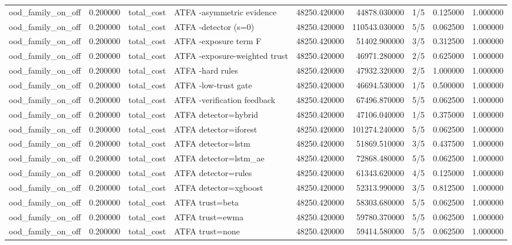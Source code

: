 \begin{tabular}{lrllrrlrr}
ood\_family\_on\_off & 0.200000 & total\_cost & ATFA -asymmetric evidence & 48250.420000 & 44878.030000 & 1/5 & 0.125000 & 1.000000 \\
ood\_family\_on\_off & 0.200000 & total\_cost & ATFA -detector (s=0) & 48250.420000 & 110543.030000 & 5/5 & 0.062500 & 1.000000 \\
ood\_family\_on\_off & 0.200000 & total\_cost & ATFA -exposure term F & 48250.420000 & 51402.900000 & 3/5 & 0.312500 & 1.000000 \\
ood\_family\_on\_off & 0.200000 & total\_cost & ATFA -exposure-weighted trust & 48250.420000 & 46971.280000 & 2/5 & 0.625000 & 1.000000 \\
ood\_family\_on\_off & 0.200000 & total\_cost & ATFA -hard rules & 48250.420000 & 47932.320000 & 2/5 & 1.000000 & 1.000000 \\
ood\_family\_on\_off & 0.200000 & total\_cost & ATFA -low-trust gate & 48250.420000 & 46694.530000 & 1/5 & 0.500000 & 1.000000 \\
ood\_family\_on\_off & 0.200000 & total\_cost & ATFA -verification feedback & 48250.420000 & 67496.870000 & 5/5 & 0.062500 & 1.000000 \\
ood\_family\_on\_off & 0.200000 & total\_cost & ATFA detector=hybrid & 48250.420000 & 47106.040000 & 1/5 & 0.375000 & 1.000000 \\
ood\_family\_on\_off & 0.200000 & total\_cost & ATFA detector=iforest & 48250.420000 & 101274.240000 & 5/5 & 0.062500 & 1.000000 \\
ood\_family\_on\_off & 0.200000 & total\_cost & ATFA detector=lstm & 48250.420000 & 51869.510000 & 3/5 & 0.437500 & 1.000000 \\
ood\_family\_on\_off & 0.200000 & total\_cost & ATFA detector=lstm\_ae & 48250.420000 & 72868.480000 & 5/5 & 0.062500 & 1.000000 \\
ood\_family\_on\_off & 0.200000 & total\_cost & ATFA detector=rules & 48250.420000 & 61343.620000 & 4/5 & 0.125000 & 1.000000 \\
ood\_family\_on\_off & 0.200000 & total\_cost & ATFA detector=xgboost & 48250.420000 & 52313.990000 & 3/5 & 0.812500 & 1.000000 \\
ood\_family\_on\_off & 0.200000 & total\_cost & ATFA trust=beta & 48250.420000 & 58303.680000 & 5/5 & 0.062500 & 1.000000 \\
ood\_family\_on\_off & 0.200000 & total\_cost & ATFA trust=ewma & 48250.420000 & 59780.370000 & 5/5 & 0.062500 & 1.000000 \\
ood\_family\_on\_off & 0.200000 & total\_cost & ATFA trust=none & 48250.420000 & 59414.580000 & 5/5 & 0.062500 & 1.000000 \\

\end{tabular}
